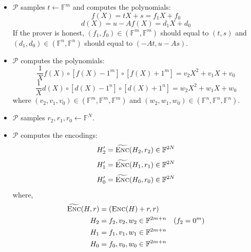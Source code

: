 \begin{itemize}
    \item $\mathcal{P}$ samples $t \leftarrow \mathbb{F}^{m}$ and computes the polynomials:
\begin{equation}
\label{eq:lwe3}
    f(X) = tX+s = f_1 X + f_0
\end{equation}
\begin{equation}
\label{eq:lwe4}
    d(X)=u-Af(X) = d_1 X + d_0
\end{equation}
If the prover is honest, $(f_1, f_0) \in (\mathbb{F}^m, \mathbb{F}^m)$ should equal to $(t, s)$ and $(d_1, d_0) \in (\mathbb{F}^n, \mathbb{F}^n)$ should equal to $(-At, u-As)$.

    \item $\mathcal{P}$ computes the polynomials:
\begin{equation}
\label{eq:lwe1}
    \frac{1}{X} f(X) \circ [f(X) - 1^m] \circ [f(X) + 1^m] = v_2X^2 + v_1X + v_0
\end{equation}
\begin{equation}
\label{eq:lwe2}
    \frac{1}{X} d(X) \circ [d(X) - 1^n] \circ [d(X) + 1^n] = w_2X^2 + w_1X + w_0
\end{equation}
where $(v_2, v_1, v_0) \in (\mathbb{F}^m, \mathbb{F}^m, \mathbb{F}^m)$ and $(w_2, w_1, w_0) \in (\mathbb{F}^n, \mathbb{F}^n, \mathbb{F}^n)$.

    \item $\mathcal{P}$ samples $r_2, r_1, r_0 \leftarrow \mathbb{F}^N$.


    \item $\mathcal{P}$ computes the encodings:
\begin{equation*}
    H_2^\prime = \widetilde{\textsc{Enc}}(H_2, r_2) \in \mathbb{F}^{2N}
\end{equation*}
\begin{equation*}
    H_1^\prime = \widetilde{\textsc{Enc}}(H_1, r_1) \in \mathbb{F}^{2N}
\end{equation*}
\begin{equation*}
    H_0^\prime = \widetilde{\textsc{Enc}}(H_0, r_0) \in \mathbb{F}^{2N}
\end{equation*}
where, 
\begin{align*}
    \widetilde{\textsc{Enc}}(H, r) &= (\textsc{Enc}(H) + r, r) \\ 
    H_2 &= f_2, v_2, w_2
    \in \mathbb{F}^{2m+n} \quad (f_2 = 0^m) \\
    H_1 &= f_1, v_1, w_1
    \in \mathbb{F}^{2m+n} \\
    H_0 &= f_0, v_0, w_0
    \in \mathbb{F}^{2m+n}
\end{align*}


\end{itemize}
